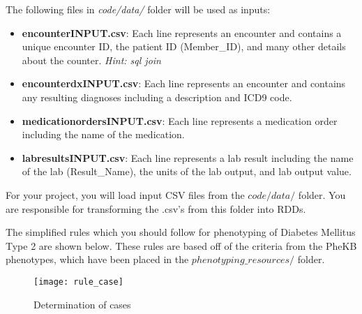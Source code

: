 \documentclass[12pt]{article}
\begin{document}
The following files in \textit{code/data/} folder will be used as inputs:
\begin{itemize}
\item \textbf{encounter\textunderscore INPUT.csv}: Each line represents an encounter and contains a unique encounter ID, the patient ID (Member\_ID), and many other details about the counter. \textit{Hint: sql join}
\item \textbf{encounter\textunderscore dx\textunderscore INPUT.csv}: Each line represents an encounter and contains any resulting diagnoses including a description and ICD9 code.
\item \textbf{medication\textunderscore orders\textunderscore INPUT.csv}: Each line represents a medication order including the name of the medication.
\item \textbf{lab\textunderscore results\textunderscore INPUT.csv}: Each line represents a lab result including the name of the lab (Result\_Name), the units of the lab output, and lab output value.
\end{itemize}
For your project, you will load input CSV files from the $code/data/$ folder. You are responsible for transforming the .csv's from this folder into RDDs.

The simplified rules which you should follow for phenotyping of Diabetes Mellitus Type 2 are shown below. These rules are based off of the criteria from the PheKB phenotypes, which have been placed in the $phenotyping\_resources/$ folder.

\begin{figure}[!h]
  \centering
  \texttt{[image: rule\_case]}
  \caption{Determination of cases}
  \label{fig:rule_case}
\end{figure}
\end{document}
